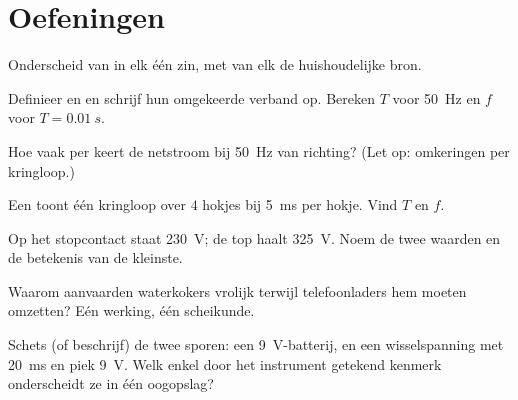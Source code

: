 \section{Oefeningen}

\begin{exercise}[$\star$]\label{exo:g9:alternating-current:1}
Onderscheid  van  in elk één zin, met van elk
de huishoudelijke bron.
\end{exercise}

\begin{exercise}[$\star$]\label{exo:g9:alternating-current:2}
Definieer  en  en schrijf hun
omgekeerde verband op. Bereken $T$ voor \qty{50}{Hz} en $f$ voor
$T = \qty{0.01}{s}$.
\end{exercise}

\begin{exercise}[$\star$]\label{exo:g9:alternating-current:3}
Hoe vaak per  keert de netstroom bij \qty{50}{Hz} van richting?
(Let op: omkeringen per kringloop.)
\end{exercise}

\begin{exercise}[$\star$]\label{exo:g9:alternating-current:4}
Een  toont één kringloop over $4$ hokjes bij \qty{5}{ms}
per hokje. Vind $T$ en $f$.
\end{exercise}

\begin{exercise}[$\star$]\label{exo:g9:alternating-current:5}
Op het stopcontact staat \qty{230}{V}; de top haalt \qty{325}{V}. Noem
de twee waarden en de betekenis van de kleinste.
\end{exercise}

\begin{exercise}[$\star$]\label{exo:g9:alternating-current:6}
Waarom aanvaarden waterkokers  vrolijk terwijl
telefoonladers hem moeten omzetten? Eén werking, één scheikunde.
\end{exercise}

\begin{exercise}[$\star$]\label{exo:g9:alternating-current:7}
Schets (of beschrijf) de twee sporen: een \qty{9}{V}-batterij,
en een wisselspanning met  \qty{20}{ms} en piek
\qty{9}{V}. Welk enkel door het instrument getekend kenmerk
onderscheidt ze in één oogopslag?
\end{exercise}

